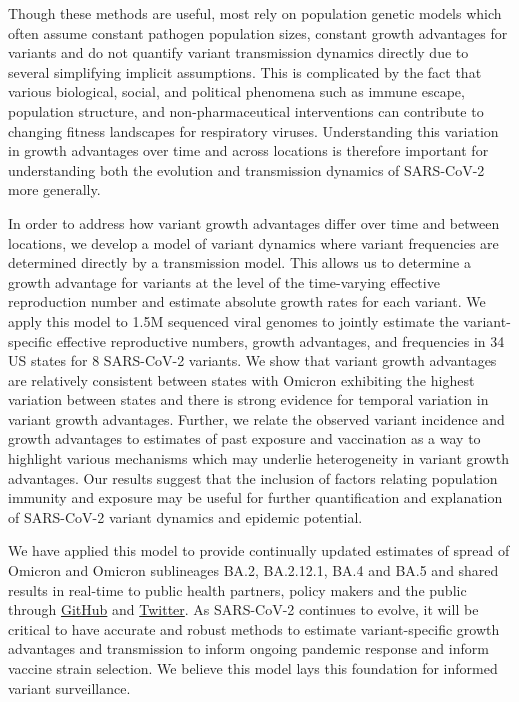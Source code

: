 \documentclass[11pt]{article}
\begin{document}
Though these methods are useful, most rely on population genetic models which often assume constant pathogen population sizes, constant growth advantages for variants and do not quantify variant transmission dynamics directly due to several simplifying implicit assumptions.
This is complicated by the fact that various biological, social, and political phenomena such as immune escape, population structure, and non-pharmaceutical interventions can contribute to changing fitness landscapes for respiratory viruses.
Understanding this variation in growth advantages over time and across locations is therefore important for understanding both the evolution and transmission dynamics of SARS-CoV-2 more generally.

In order to address how variant growth advantages differ over time and between locations, we develop a model of variant dynamics where variant frequencies are determined directly by a transmission model.
This allows us to determine a growth advantage for variants at the level of the time-varying effective reproduction number and estimate absolute growth rates for each variant.
We apply this model to 1.5M sequenced viral genomes to jointly estimate the variant-specific effective reproductive numbers, growth advantages, and frequencies in 34 US states for 8 SARS-CoV-2 variants.
We show that variant growth advantages are relatively consistent between states with Omicron exhibiting the highest variation between states and there is strong evidence for temporal variation in variant growth advantages.
Further, we relate the observed variant incidence and growth advantages to estimates of past exposure and vaccination as a way to highlight various mechanisms which may underlie heterogeneity in variant growth advantages.
Our results suggest that the inclusion of factors relating population immunity and exposure may be useful for further quantification and explanation of SARS-CoV-2 variant dynamics and epidemic potential.

We have applied this model to provide continually updated estimates of spread of Omicron and Omicron sublineages BA.2, BA.2.12.1, BA.4 and BA.5 and shared results in real-time to public health partners, policy makers and the public through \href{https://github.com/blab/rt-from-frequency-dynamics}{GitHub} and \href{https://twitter.com/trvrb/status/1530649628625936384}{Twitter}.
As SARS-CoV-2 continues to evolve, it will be critical to have accurate and robust methods to estimate variant-specific growth advantages and transmission to inform ongoing pandemic response and inform vaccine strain selection.
We believe this model lays this foundation for informed variant surveillance.
\end{document}
